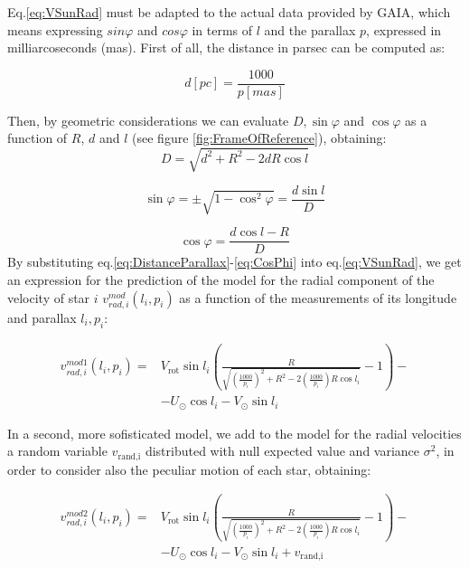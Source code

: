 

Eq.\ref{eq:VSunRad} must be adapted to the actual data provided by GAIA, which means expressing $sin\varphi$ and $cos\varphi$ in terms of $l$ and the parallax $p$, expressed in milliarcoseconds (\unit{mas}). First of all, the distance in parsec can be computed as:

\begin{equation}\label{eq:DistanceParallax}
    d[\unit{pc}] = \frac{1000}{p[\unit{mas}]}
\end{equation}

\noindent
Then, by geometric considerations we can evaluate $D, \sin\varphi$ and $\cos\varphi$ as a function of $R$, $d$ and $l$ (see figure \ref{fig:FrameOfReference}), obtaining:
\begin{equation}\label{eq:D}
    D=\sqrt{d^2 + R^2 - 2dR \cos l}
\end{equation}

\begin{equation}\label{eq:SinPhi}
    \sin\varphi = \pm \sqrt{1 - \cos^2 \varphi} = \frac{d\sin l}{D}
\end{equation}

\begin{equation}\label{eq:CosPhi}
    \cos\varphi = \frac{d \cos l - R}{D}
\end{equation}
\noindent
By substituting eq.\ref{eq:DistanceParallax}-\ref{eq:CosPhi} into eq.\ref{eq:VSunRad}, we get an expression for the prediction of the model for the radial component of the velocity of star $i$ $v_{rad,i}^{mod}(l_i, p_i)$ as a function of the measurements of its longitude and parallax $l_i, p_i$:

\begin{equation}\label{eq:VradModel1}
    \begin{aligned}
        v_{rad,i}^{mod1}(l_i, p_i) =&  V_{\text{rot}}\sin l_i (\frac{R}{\sqrt{(\frac{1000}{p_i})^2 + R^2 - 2(\frac{1000}{p_i})R \cos l_i}}-1) -\\
        &- U_{\odot}\cos l_i - V_{\odot}\sin l_i
    \end{aligned}
\end{equation}

In a second, more sofisticated model, we add to the model for the radial velocities a random variable $v_{\text{rand,i}}$ distributed with null expected value and variance $\sigma^2$, in order to consider also the peculiar motion of each star, obtaining:

\begin{equation}\label{eq:VradModel2}
    \begin{aligned}
        v_{rad,i}^{mod2}(l_i, p_i) =&  V_{\text{rot}}\sin l_i (\frac{R}{\sqrt{(\frac{1000}{p_i})^2 + R^2 - 2(\frac{1000}{p_i})R \cos l_i}}-1) -\\
        &- U_{\odot}\cos l_i - V_{\odot}\sin l_i + v_{\text{rand,i}}
    \end{aligned}
\end{equation}